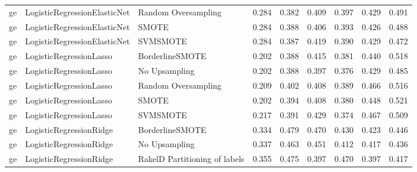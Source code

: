 \begin{tabular}{lllllllll}
      ge &    LogisticRegressionElasticNet &           Random Oversampling & 0.284 &                     0.382 &                 0.409 &                  0.397 &                                   0.429 &     0.491 \\
      ge &    LogisticRegressionElasticNet &                         SMOTE & 0.284 &                     0.388 &                 0.406 &                  0.393 &                                   0.426 &     0.488 \\
      ge &    LogisticRegressionElasticNet &                      SVMSMOTE & 0.284 &                     0.387 &                 0.419 &                  0.390 &                                   0.429 &     0.472 \\
      ge &         LogisticRegressionLasso &               BorderlineSMOTE & 0.202 &                     0.388 &                 0.415 &                  0.381 &                                   0.440 &     0.518 \\
      ge &         LogisticRegressionLasso &                 No Upsampling & 0.202 &                     0.388 &                 0.397 &                  0.376 &                                   0.429 &     0.485 \\
      ge &         LogisticRegressionLasso &           Random Oversampling & 0.209 &                     0.402 &                 0.408 &                  0.389 &                                   0.466 &     0.516 \\
      ge &         LogisticRegressionLasso &                         SMOTE & 0.202 &                     0.394 &                 0.408 &                  0.380 &                                   0.448 &     0.521 \\
      ge &         LogisticRegressionLasso &                      SVMSMOTE & 0.217 &                     0.391 &                 0.429 &                  0.374 &                                   0.467 &     0.509 \\
      ge &         LogisticRegressionRidge &               BorderlineSMOTE & 0.334 &                     0.479 &                 0.470 &                  0.430 &                                   0.423 &     0.446 \\
      ge &         LogisticRegressionRidge &                 No Upsampling & 0.337 &                     0.463 &                 0.451 &                  0.412 &                                   0.417 &     0.436 \\
      ge &         LogisticRegressionRidge & RakelD Partitioning of labels & 0.355 &                     0.475 &                 0.397 &                  0.470 &                                   0.397 &     0.417 \\

\end{tabular}
